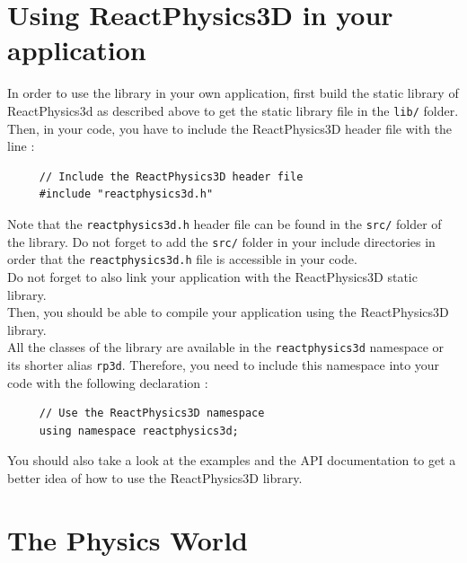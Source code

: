 \documentclass[a4paper,12pt]{article}
\begin{document}
    \section{Using ReactPhysics3D in your application}

    In order to use the library in your own application, first build
    the static library of ReactPhysics3d as described above to get the
    static library file in the \texttt{lib/} folder. Then, in your code, you have to include
    the ReactPhysics3D header file with the line : \\

    \begin{lstlisting}
     // Include the ReactPhysics3D header file
     #include "reactphysics3d.h"
  \end{lstlisting}
   
    \vspace{0.6cm}

    Note that the \texttt{reactphysics3d.h} header file can be found in the
    \texttt{src/} folder of the library. Do not forget to add the
    \texttt{src/} folder in your include directories in order that the
    \texttt{reactphysics3d.h} file is accessible in your code. \\

    Do not forget to also link your application with the ReactPhysics3D
    static library.  \\
  
    Then, you should be able to compile your application using the
    ReactPhysics3D library. \\

    All the classes of the library are available in the \texttt{reactphysics3d} namespace or its shorter alias
    \texttt{rp3d}. Therefore, you need to include this namespace into your code with the following declaration : \\

    \begin{lstlisting}
     // Use the ReactPhysics3D namespace
     using namespace reactphysics3d;
  \end{lstlisting}

    \vspace{0.6cm}

    You should also take a look at the examples and the API documentation to get a better idea of how to use the
    ReactPhysics3D library.

    \section{The Physics World}
\end{document}
